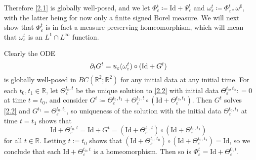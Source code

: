 \documentclass[reqno,centertags,12pt]{amsart}
\theoremstyle{definition}
\numberwithin{equation}{section}
\newcommand{\bbR}{{\mathbb{R}}}
\newcommand{\eps}{\varepsilon}
\begin{document}
Therefore \eqref{2.1} is globally well-posed, and we  let
$\Phi_{\eps}^{t}\coloneqq \mathrm{Id} + \Psi_{\eps}^{t}$ and
$\omega_{\eps}^{t}\coloneqq\Phi_{\eps*}^{t}\omega^{0}$, with the latter being for now only a finite signed Borel measure.
We will next show that $\Phi_{\eps}^{t}$ is in fact a measure-preserving homeomorphism, which will mean that $\omega_{\eps}^{t}$ is an $L^{1}\cap L^\infty$ function.

Clearly the ODE
\begin{equation}\label{2.2}
    \partial_{t}G^{t} = u_{\eps}(\omega_{\eps}^{t})\circ ({\rm Id} + G^{t})
\end{equation}
is globally well-posed in $BC(\bbR^{2};\bbR^{2})$ for any initial data at any initial time.
For each $t_{0},t_1\in\bbR$, let $\Theta_{\eps}^{t_{0},t}$ be the unique solution to \eqref{2.2}
with initial data $\Theta_{\eps}^{t_{0},t_{0}}: = 0$ at time $t=t_0$, and consider
$G^{t} \coloneqq \Theta_{\eps}^{t_{0},t_{1}} +
\Theta_{\eps}^{t_{1},t}\circ(\mathrm{Id} + \Theta_{\eps}^{t_{0},t_{1}})$.  Then
 $G^t$ solves \eqref{2.2} and 
$G^{t_{1}} = \Theta_{\eps}^{t_{0},t_{1}}$, so uniqueness of the solution
with the initial data $\Theta_{\eps}^{t_{0},t_{1}}$ at time $t=t_{1}$ shows that
\[
    \mathrm{Id} + \Theta_{\eps}^{t_{0},t}
    = \mathrm{Id} + G^{t}
    = (\mathrm{Id} + \Theta_{\eps}^{t_{1},t})
    \circ(\mathrm{Id} + \Theta_{\eps}^{t_{0},t_{1}})
\]
 for all $t\in\bbR$. Letting $t:=t_{0}$ shows that
$(\mathrm{Id} + \Theta_{\eps}^{t_{1},t_{0}})
\circ(\mathrm{Id} + \Theta_{\eps}^{t_{0},t_{1}}) = \mathrm{Id}$,
so we conclude that each $\mathrm{Id} + \Theta_{\eps}^{t_{0},t}$ is a homeomorphism.
Then so is $\Phi_{\eps}^{t} = \mathrm{Id} + \Theta_{\eps}^{0,t}$.
\end{document}
